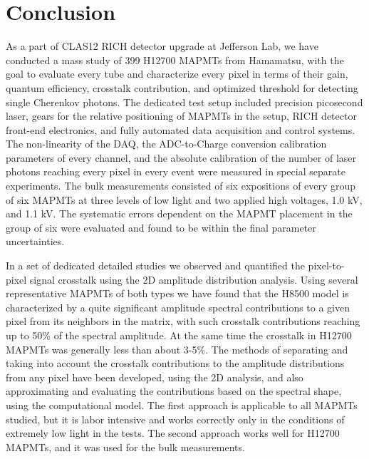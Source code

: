\section{Conclusion}

As a part of CLAS12 RICH detector upgrade at Jefferson Lab, we have conducted a mass study of 399 H12700 MAPMTs from Hamamatsu, with the goal to evaluate every tube and characterize every pixel in terms of their gain, quantum efficiency, crosstalk contribution, and optimized threshold for detecting single Cherenkov photons. The dedicated test setup included precision picosecond laser, gears for the relative positioning of MAPMTs in the setup, RICH detector front-end electronics, and fully automated data acquisition and control systems. The non-linearity of the DAQ, the ADC-to-Charge conversion calibration parameters of every channel, and the absolute calibration of the number of laser photons reaching every pixel in every event were measured in special separate experiments. The bulk measurements consisted of six expositions of every group of six MAPMTs at three levels of low light and two applied high voltages, 1.0 kV, and 1.1 kV. The systematic errors dependent on the MAPMT placement in the group of six were evaluated and found to be within the final parameter uncertainties.

In a set of dedicated detailed studies we observed and quantified the pixel-to-pixel signal crosstalk using the 2D amplitude distribution analysis. Using several representative MAPMTs of both types we have found that the H8500 model is characterized by a quite significant amplitude spectral contributions to a given pixel from its neighbors in the matrix, with such crosstalk contributions reaching up to 50\% of the spectral amplitude. At the same time the crosstalk in H12700 MAPMTs was generally less than about 3-5\%. The methods of separating and taking into account the crosstalk contributions to the amplitude distributions from any pixel have been developed, using the 2D analysis, and also approximating and evaluating the contributions based on the spectral shape, using the computational model. The first approach is applicable to all MAPMTs studied, but it is labor intensive and works correctly only in the conditions of extremely low light in the tests. The second approach works well for H12700 MAPMTs, and it was used for the bulk measurements.

